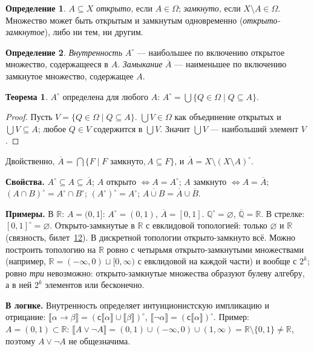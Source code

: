 \documentclass[11pt,a4paper]{article}
\newcommand{\sem}[1]{\llbracket #1\rrbracket}
\newcommand{\cmpl}{\mathsf{c}}
\newcommand{\bbR}{\mathbb{R}}
\theoremstyle{definition}
\newtheorem*{dfn}{Определение}
\newtheorem*{thm}{Теорема}
\begin{document}
\begin{dfn}
$A\subseteq X$ \emph{открыто}, если $A\in\Omega$; \emph{замкнуто}, если $X\setminus A\in\Omega$. Множество может быть открытым и замкнутым одновременно (\emph{открыто-замкнутое}), либо ни тем, ни другим.
\end{dfn}
\begin{dfn}
\emph{Внутренность} $A^\circ$ --- наибольшее по включению открытое множество, содержащееся в $A$. \emph{Замыкание} $\overline{A}$ --- наименьшее по включению замкнутое множество, содержащее $A$.
\end{dfn}
\begin{thm}
$A^\circ$ определена для любого $A$: $A^\circ=\bigcup\{Q\in\Omega\mid Q\subseteq A\}$.
\end{thm}
\begin{proof}
Пусть $V=\{Q\in\Omega\mid Q\subseteq A\}$. $\bigcup V\in\Omega$ как объединение открытых и $\bigcup V\subseteq A$; любое $Q\in V$ содержится в $\bigcup V$. Значит $\bigcup V$ --- наибольший элемент $V$.
\end{proof}
Двойственно, $\overline{A}=\bigcap\{F\mid F\text{ замкнуто},A\subseteq F\}$, и $\overline{A}=X\setminus(X\setminus A)^\circ$.

\textbf{Свойства.} $A^\circ\subseteq A\subseteq\overline{A}$; $A$ открыто $\iff A=A^\circ$; $A$ замкнуто $\iff A=\overline{A}$; $(A\cap B)^\circ=A^\circ\cap B^\circ$; $(A^\circ)^\circ=A^\circ$; $\overline{A\cup B}=\overline{A}\cup\overline{B}$.

\textbf{Примеры.} В $\bbR$: $A=(0,1]$: $A^\circ=(0,1)$, $\overline{A}=[0,1]$. $\mathbb{Q}^\circ=\varnothing$, $\overline{\mathbb{Q}}=\bbR$. В стрелке: $[0,1]^\circ=\varnothing$.
Открыто-замкнутые в $\bbR$ с евклидовой топологией: только $\varnothing$ и $\bbR$ (связность, билет~\hyperref[T:12]{12}). В дискретной топологии открыто-замкнуто всё. Можно построить топологию на $\bbR$ ровно с четырьмя открыто-замкнутыми множествами (например, $\bbR=(-\infty,0)\sqcup[0,\infty)$ с евклидовой на каждой части) и вообще с $2^k$; ровно \emph{три} невозможно: открыто-замкнутые множества образуют булеву алгебру, а в ней $2^k$ элементов или бесконечно.

\textbf{В логике.} Внутренность определяет интуиционистскую импликацию и отрицание: $\sem{\alpha\to\beta}=(\cmpl\sem{\alpha}\cup\sem{\beta})^\circ$, $\sem{\neg\alpha}=(\cmpl\sem{\alpha})^\circ$.
Пример: $A=(0,1)\subset\bbR$: $\sem{A\vee\neg A}=(0,1)\cup(-\infty,0)\cup(1,\infty)=\bbR\setminus\{0,1\}\neq\bbR$, поэтому $A\vee\neg A$ не общезначима.
\end{document}
